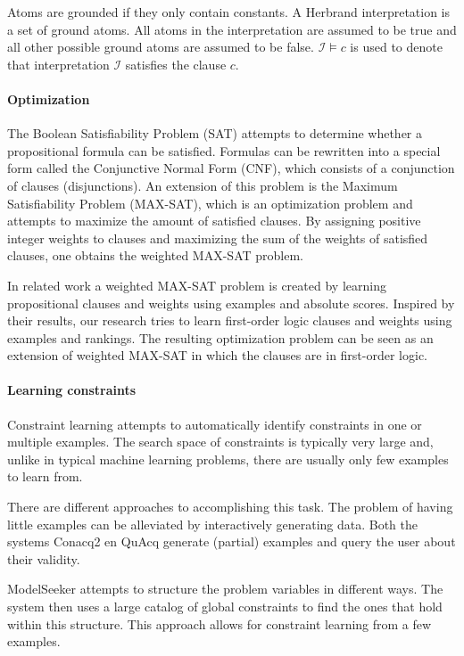 \documentclass[letterpaper]{article}
\newcommand{\sym}[1]{\ensuremath{\mathcal{#1}}}
\theoremstyle{definition}
\begin{document}
Atoms are grounded if they only contain constants.
A Herbrand interpretation is a set of ground atoms.
All atoms in the interpretation are assumed to be true and all other possible ground atoms are assumed to be false.
$\sym{I} \models c$ is used to denote that interpretation \sym{I} satisfies the clause $c$.

\paragraph{Optimization}
The Boolean Satisfiability Problem (SAT) attempts to determine whether a propositional formula can be satisfied.
Formulas can be rewritten into a special form called the Conjunctive Normal Form (CNF), which consists of a conjunction of clauses (disjunctions).
An extension of this problem is the Maximum Satisfiability Problem (MAX-SAT), which is an optimization problem and attempts to maximize the amount of satisfied clauses.
By assigning positive integer weights to clauses and maximizing the sum of the weights of satisfied clauses, one obtains the weighted MAX-SAT problem.

In related work \cite{campigotto2011active} a weighted MAX-SAT problem is created by learning propositional clauses and weights using examples and absolute scores.
Inspired by their results, our research tries to learn first-order logic clauses and weights using examples and rankings.
The resulting optimization problem can be seen as an extension of weighted MAX-SAT in which the clauses are in first-order logic.

\paragraph{Learning constraints}
Constraint learning attempts to automatically identify constraints in one or multiple examples.
The search space of constraints is typically very large and, unlike in typical machine learning problems, there are usually only few examples to learn from.

There are different approaches to accomplishing this task.
The problem of having little examples can be alleviated by interactively generating data.
Both the systems Conacq2 \cite{bessiere2007query} en QuAcq \cite{bessiere2013constraint} generate (partial) examples and query the user about their validity.

ModelSeeker \cite{Beldiceanu:ModelSeeker} attempts to structure the problem variables in different ways.
The system then uses a large catalog of global constraints to find the ones that hold within this structure. 
This approach allows for constraint learning from a few examples.
\end{document}
